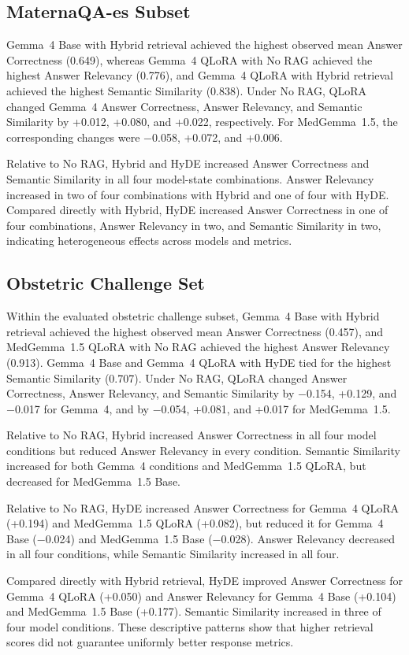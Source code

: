 \subsection{MaternaQA-es Subset}
Gemma~4 Base with Hybrid retrieval achieved the highest observed mean Answer
Correctness (0.649), whereas Gemma~4 QLoRA with No RAG achieved the highest
Answer Relevancy (0.776), and Gemma~4 QLoRA with Hybrid retrieval achieved the
highest Semantic Similarity (0.838). Under No RAG, QLoRA changed Gemma~4
Answer Correctness, Answer Relevancy, and Semantic Similarity by +0.012,
+0.080, and +0.022, respectively. For MedGemma~1.5, the corresponding changes
were $-$0.058, +0.072, and +0.006.

Relative to No RAG, Hybrid and HyDE increased Answer Correctness and Semantic
Similarity in all four model-state combinations. Answer Relevancy increased
in two of four combinations with Hybrid and one of four with HyDE. Compared
directly with Hybrid, HyDE increased Answer Correctness in one of four
combinations, Answer Relevancy in two, and Semantic Similarity in two,
indicating heterogeneous effects across models and metrics.

\subsection{Obstetric Challenge Set}
Within the evaluated obstetric challenge subset, Gemma~4 Base with Hybrid
retrieval achieved the highest observed mean Answer Correctness (0.457), and
MedGemma~1.5 QLoRA with No RAG achieved the highest Answer Relevancy (0.913).
Gemma~4 Base and Gemma~4 QLoRA with HyDE tied for the highest Semantic
Similarity (0.707). Under No RAG, QLoRA changed Answer Correctness, Answer
Relevancy, and Semantic Similarity by $-$0.154, +0.129, and $-$0.017 for
Gemma~4, and by $-$0.054, +0.081, and +0.017 for MedGemma~1.5.

Relative to No RAG, Hybrid increased Answer Correctness in all four model
conditions but reduced Answer Relevancy in every condition. Semantic
Similarity increased for both Gemma~4 conditions and MedGemma~1.5 QLoRA, but
decreased for MedGemma~1.5 Base.

Relative to No RAG, HyDE increased Answer Correctness for Gemma~4 QLoRA
(+0.194) and MedGemma~1.5 QLoRA (+0.082), but reduced it for Gemma~4 Base
($-$0.024) and MedGemma~1.5 Base ($-$0.028). Answer Relevancy decreased in
all four conditions, while Semantic Similarity increased in all four.

Compared directly with Hybrid retrieval, HyDE improved Answer Correctness
for Gemma~4 QLoRA (+0.050) and Answer Relevancy for Gemma~4 Base (+0.104)
and MedGemma~1.5 Base (+0.177). Semantic Similarity increased in three of
four model conditions. These descriptive patterns show that higher retrieval
scores did not guarantee uniformly better response metrics.

